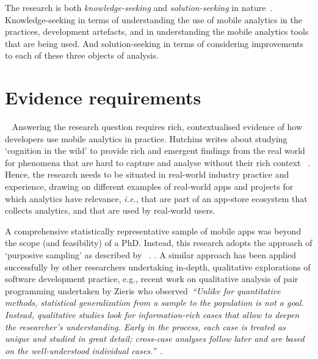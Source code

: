 The research is both \emph{knowledge-seeking} and \emph{solution-seeking} in nature~. Knowledge-seeking in terms of understanding the use of mobile analytics in the practices, development artefacts, and in understanding the mobile analytics tools that are being used. And solution-seeking in terms of considering improvements to each of these three objects of analysis.

\section{Evidence requirements}~\label{methodology-evidence-requirements}
Answering the research question requires rich, contextualised evidence of how developers use mobile analytics in practice. Hutchins writes about studying `cognition in the wild' to provide rich and emergent findings from the real world for phenomena that are hard to capture and analyse without their rich context
~.
Hence, the research needs to be situated in real-world industry practice and experience, drawing on different examples of real-world apps and projects for which analytics have relevance, \textit{i.e.}, that are part of an app-store ecosystem that collects analytics, and that are used by real-world users. 

A comprehensive statistically representative sample of mobile apps was beyond the scope (and feasibility) of a PhD. Instead, this research adopts the approach of `purposive sampling'  as described by ~. . A similar approach has been applied successfully by other researchers undertaking in-depth, qualitative explorations of software development practice, e.g., recent work on qualitative analysis of pair programming undertaken by Zieris who observed~\emph{``Unlike for quantitative methods, statistical generalization from a sample to the population is not a goal. Instead, qualitative studies look for information-rich cases that allow to deepen the researcher’s understanding. Early in the process, each case is treated as unique and studied in great detail; cross-case analyses follow later and are based on the well-understood individual cases.''}~. 

